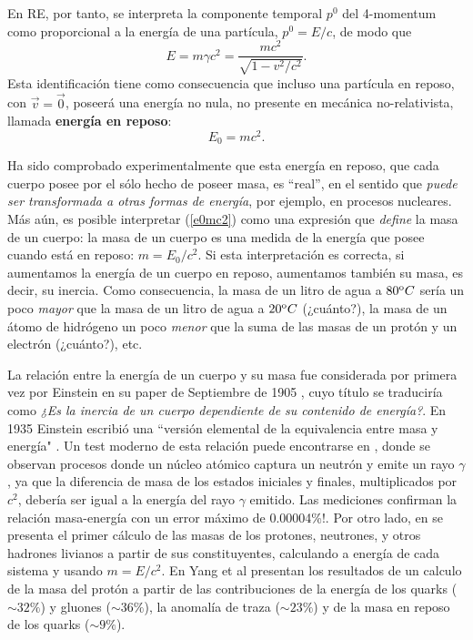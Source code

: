 En RE, por tanto, se interpreta la componente temporal $p^0$ del 4-momentum como proporcional a la energía de una partícula, $p^0=E/c$, de modo que
\begin{equation}
 \boxed{E=m\gamma c^2=\frac{mc^2}{\sqrt{1-v^2/c^2}}.} \label{emgc2}
\end{equation}
 Esta identificación tiene como consecuencia que incluso una  partícula en reposo, con
$\vec{v}=\vec{0}$, poseerá una energía no nula, no presente en mecánica
no-relativista, llamada \textbf{energía en reposo}:
\begin{equation}
\boxed{E_0=mc^2.} \label{e0mc2}
\end{equation}

Ha sido comprobado experimentalmente que esta energía en reposo, que cada
cuerpo posee por el sólo hecho de poseer masa, es ``real'', en el
sentido que \textit{puede ser transformada a otras formas de energía}, por ejemplo, en procesos nucleares. Más aún, es posible interpretar (\ref{e0mc2}) como una expresión que \textit{define} la masa de un cuerpo: la masa de un cuerpo es una medida de la energía que posee cuando está en reposo: $m=E_0/c^2$. Si esta interpretación es correcta, si aumentamos la energía de un cuerpo en reposo, aumentamos también su masa, es decir, su inercia. Como consecuencia, la masa de un litro de agua a $80^{\rm o} C$ sería un poco \textit{mayor} que la masa de un litro de agua a $20^{\rm o} C$ (¿cuánto?), la masa de un átomo de hidrógeno un poco \textit{menor} que la suma de las masas de un protón y un electrón (¿cuánto?), etc.

La relación entre la energía de un cuerpo y su masa fue considerada por primera vez por Einstein en su paper de Septiembre de 1905 \cite{Einstein05}, cuyo título se traduciría como \textit{¿Es la inercia de un cuerpo dependiente de su contenido de energía?}. En 1935 Einstein escribió una ``versión elemental de la equivalencia entre masa y energía" \cite{Einstein35}. Un test moderno de esta relación puede encontrarse en \cite{Rainville05}, donde se observan procesos donde un núcleo atómico captura un neutrón y emite un rayo $\gamma$, ya que la diferencia de masa de los estados iniciales y finales, multiplicados por $c^2$, debería ser igual a la energía del rayo $\gamma$ emitido. Las mediciones confirman la relación masa-energía con un error máximo de 0.00004\%!. Por otro lado, en \cite{Duerr08} se presenta el primer cálculo de las masas de los protones, neutrones, y otros hadrones livianos a partir de sus constituyentes, calculando a energía de cada sistema y usando $m=E/c^2$. En \cite{Yang18} Yang et al presentan los resultados de un calculo de la masa del protón a partir de las contribuciones de la energía de los quarks ($\sim 32\%$) y gluones ($\sim 36\%$), la anomalía de traza ($\sim 23\%$) y de la masa en reposo de los quarks ($\sim 9\%$).

